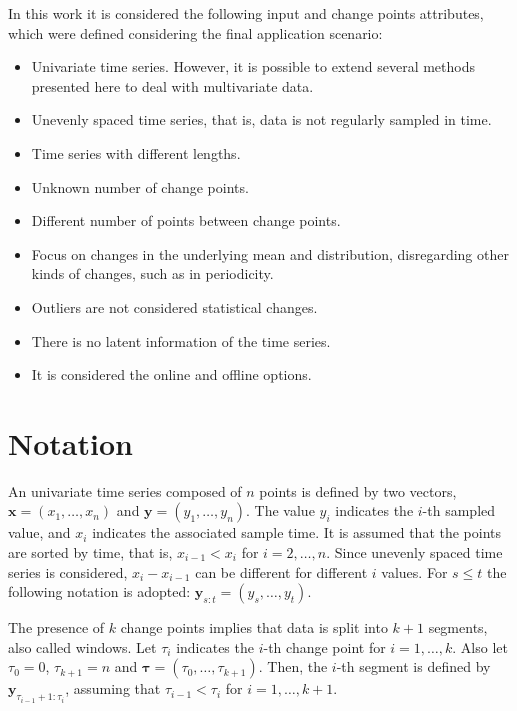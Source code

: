 In this work it is considered the following input and change points attributes,
which were defined considering the final application scenario:
\begin{itemize}
\item Univariate time series. However, it is possible to extend several
    methods presented here to deal with multivariate data.
\item Unevenly spaced time series, that is, data is not regularly sampled in
    time.
\item Time series with different lengths.
\item Unknown number of change points.
\item Different number of points between change points.
\item Focus on changes in the underlying mean and distribution, disregarding
    other kinds of changes, such as in periodicity.
\item Outliers are not considered statistical changes.
\item There is no latent information of the time series.
\item It is considered the online and offline options.
\end{itemize}

\section{Notation}

An univariate time series composed of $n$ points is defined by two vectors,
$\mathbf{x} = (x_{1}, \ldots, x_{n})$ and $\mathbf{y} = (y_{1}, \ldots, y_{n})$.
The value $y_{i}$ indicates the $i$-th sampled value, and $x_{i}$ indicates the
associated sample time. It is assumed that the points are sorted by time, that
is, $x_{i - 1} < x_{i}$ for $i = 2, \ldots, n$. Since unevenly spaced time
series is considered, $x_{i} - x_{i - 1}$ can be different for different $i$
values. For $s \le t$ the following notation is adopted:
$\mathbf{y}_{s:t} = (y_{s}, \ldots, y_{t})$.

The presence of $k$ change points implies that data is split into $k+1$
segments, also called windows. Let $\tau_{i}$ indicates the $i$-th change point
for $i=1, \ldots, k$. Also let $\tau_{0} = 0$, $\tau_{k + 1} = n$ and
$\boldsymbol \tau = (\tau_{0}, \ldots, \tau_{k + 1})$. Then, the $i$-th segment
is defined by $\mathbf{y}_{\tau_{i - 1} + 1 : \tau_{i}}$, assuming that
$\tau_{i - 1} < \tau_{i}$ for $i = 1, \ldots, k + 1$.

